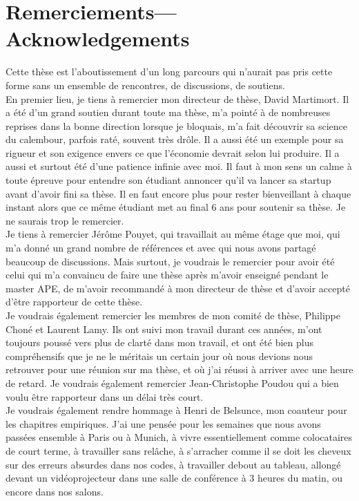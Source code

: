 \chapter*{Remerciements---Acknowledgements}
Cette thèse est l'aboutissement d'un long parcours qui n'aurait pas pris cette forme sans un ensemble de rencontres, de discussions, de soutiens.\\

En premier lieu, je tiens à remercier mon directeur de thèse, David Martimort. Il a été d'un grand soutien durant toute ma thèse, m'a pointé à de nombreuses reprises dans la bonne direction lorsque je bloquais, m'a fait découvrir sa science du calembour, parfois raté, souvent très drôle. Il a aussi été un exemple pour sa rigueur et son exigence envers ce que l'économie devrait selon lui produire. Il a aussi et surtout été d'une patience infinie avec moi. Il faut à mon sens un calme à toute épreuve pour entendre son étudiant annoncer qu'il va lancer sa startup avant d'avoir fini sa thèse. Il en faut encore plus pour rester bienveillant à chaque instant alors que ce même étudiant met au final 6 ans pour soutenir sa thèse. Je ne saurais trop le remercier. \\

Je tiens à remercier Jérôme Pouyet, qui travaillait au même étage que moi, qui m'a donné un grand nombre de références et avec qui nous avons partagé beaucoup de discussions. Mais surtout, je voudrais le remercier pour avoir été celui qui m'a convaincu de faire une thèse après m'avoir enseigné pendant le master APE, de m'avoir recommandé à mon directeur de thèse et d'avoir accepté d'être rapporteur de cette thèse.\\

Je voudrais également remercier les membres de mon comité de thèse, Philippe Choné et Laurent Lamy. Ils ont suivi mon travail durant ces années, m'ont toujours poussé vers plus de clarté dans mon travail, et ont été bien plus compréhensifs que je ne le méritais un certain jour où nous devions nous retrouver pour une réunion sur ma thèse, et où j'ai réussi à arriver avec une heure de retard. Je voudrais également remercier Jean-Christophe Poudou qui a bien voulu être rapporteur dans un délai très court.\\

Je voudrais également rendre hommage à Henri de Belsunce, mon coauteur pour les chapitres empiriques. J'ai une pensée pour les semaines que nous avons passées ensemble à Paris ou à Munich, à vivre essentiellement comme colocataires de court terme, à travailler sans relâche, à s'arracher comme il se doit les cheveux sur des erreurs absurdes dans nos codes, à travailler debout au tableau, allongé devant un vidéoprojecteur dans une salle de conférence à 3 heures du matin, ou encore dans nos salons. \\

